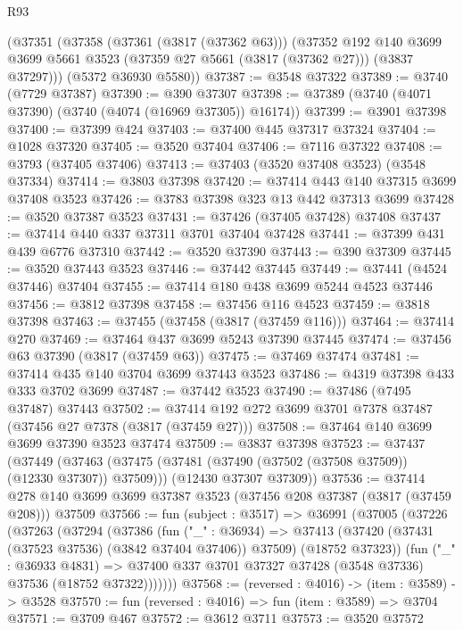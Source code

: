 \begin{lexlean}{R93}
\begin{coremodule}
    (@37351
      (@37358
        (@37361 (@3817 (@37362 @63)))
        (@37352
          @192
          @140
          @3699
          @3699
          @5661
          @3523
          (@37359 @27 @5661 (@3817 (@37362 @27)))
          (@3837 @37297)))
      (@5372 @36930 @5580))
@37387 := @3548 @37322
@37389 := @3740 (@7729 @37387)
@37390 := @390 @37307
@37398 := @37389 (@3740 (@4071 @37390) (@3740 (@4074 (@16969 @37305)) @16174))
@37399 := @3901 @37398
@37400 := @37399 @424
@37403 := @37400 @445 @37317 @37324
@37404 := @1028 @37320
@37405 := @3520 @37404
@37406 := @7116 @37322
@37408 := @3793 (@37405 @37406)
@37413 := @37403 (@3520 @37408 @3523) (@3548 @37334)
@37414 := @3803 @37398
@37420 := @37414 @443 @140 @37315 @3699 @37408 @3523
@37426 := @3783 @37398 @323 @13 @442 @37313 @3699
@37428 := @3520 @37387 @3523
@37431 := @37426 (@37405 @37428) @37408
@37437 := @37414 @440 @337 @37311 @3701 @37404 @37428
@37441 := @37399 @431 @439 @6776 @37310
@37442 := @3520 @37390
@37443 := @390 @37309
@37445 := @3520 @37443 @3523
@37446 := @37442 @37445
@37449 := @37441 (@4524 @37446) @37404
@37455 := @37414 @180 @438 @3699 @5244 @4523 @37446
@37456 := @3812 @37398
@37458 := @37456 @116 @4523
@37459 := @3818 @37398
@37463 := @37455 (@37458 (@3817 (@37459 @116)))
@37464 := @37414 @270
@37469 := @37464 @437 @3699 @5243 @37390 @37445
@37474 := @37456 @63 @37390 (@3817 (@37459 @63))
@37475 := @37469 @37474
@37481 := @37414 @435 @140 @3704 @3699 @37443 @3523
@37486 := @4319 @37398 @433 @333 @3702 @3699
@37487 := @37442 @3523
@37490 := @37486 (@7495 @37487) @37443
@37502 := @37414 @192 @272 @3699 @3701 @7378 @37487 (@37456 @27 @7378 (@3817 (@37459 @27)))
@37508 := @37464 @140 @3699 @3699 @37390 @3523 @37474
@37509 := @3837 @37398
@37523 := @37437
    (@37449
      (@37463 (@37475 (@37481 (@37490 (@37502 (@37508 @37509)) (@12330 @37307)) @37509)))
      (@12430 @37307 @37309))
@37536 := @37414
    @278
    @140
    @3699
    @3699
    @37387
    @3523
    (@37456 @208 @37387 (@3817 (@37459 @208)))
    @37509
@37566 := fun (subject : @3517) =>
  @36991
    (@37005
      (@37226
        (@37263
          (@37294
            (@37386
              (fun ("_" : @36934) =>
              @37413 (@37420 (@37431 (@37523 @37536) (@3842 @37404 @37406)) @37509) (@18752 @37323))
              (fun ("_" : @36933 @4831) =>
              @37400 @337 @3701 @37327 @37428 (@3548 @37336) @37536 (@18752 @37322)))))))
@37568 := (reversed : @4016) -> (item : @3589) -> @3528
@37570 := fun (reversed : @4016) => fun (item : @3589) => @3704
@37571 := @3709 @467
@37572 := @3612 @3711
@37573 := @3520 @37572

\end{coremodule}
\end{lexlean}
